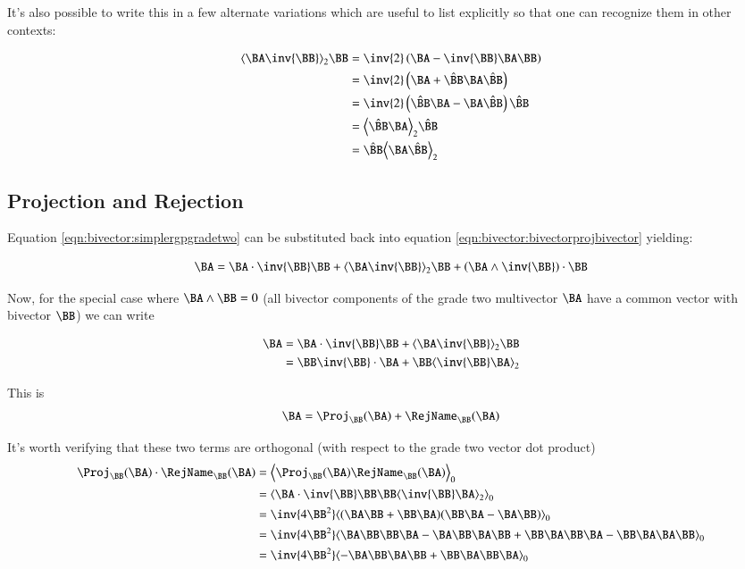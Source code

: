 It's also possible to write this in a few alternate variations which are useful to list explicitly so that one can recognize them in other contexts:

\begin{align*}
\gpgradetwo{\BA\inv{\BB}} \BB
&= \inv{2}\left(\BA - \inv{\BB}\BA\BB\right)  \\
&= \inv{2}\left(\BA + \hat{\BB}\BA\hat{\BB}\right)  \\
&= \inv{2}\left( \hat{\BB}\BA -\BA\hat{\BB} \right)\hat{\BB} \\
&= \gpgradetwo{\hat{\BB}\BA}\hat{\BB} \\
&= \hat{\BB}\gpgradetwo{{\BA}\hat{\BB}} \\
\end{align*}

\subsection{Projection and Rejection }

Equation \ref{eqn:bivector:simplergpgradetwo} can be substituted back into equation \ref{eqn:bivector:bivectorprojbivector} yielding:

\begin{equation}
\label{eqn:bivector:simplerbivectorprojbivector}
\BA =
\BA \cdot \inv{\BB} \BB \\
+\gpgradetwo{\BA\inv{\BB}} \BB
+\left(\BA \wedge \inv{\BB}\right) \cdot \BB 
\end{equation}

Now, for the special case where $\BA \wedge \BB = 0$ (all bivector components of the grade two multivector $\BA$ have a common vector with bivector $\BB$) we can write

\begin{align*}
\BA 
&= \BA \cdot \inv{\BB} \BB +\gpgradetwo{\BA\inv{\BB}} \BB \\
&= \BB \inv{\BB} \cdot {\BA} + \BB \gpgradetwo{\inv{\BB}\BA} \\
\end{align*}

This is
\begin{align}
\label{eqn:bivector:projrejbivectorbivector}
\BA = \Proj_{\BB}(\BA) + \RejName_{\BB}(\BA) 
\end{align}

It's worth verifying that these two terms are orthogonal (with respect to the grade two vector dot product)
\begin{align*}
\Proj_{\BB}(\BA) \cdot \RejName_{\BB}(\BA)
&= \gpgradezero{ \Proj_{\BB}(\BA) \RejName_{\BB}(\BA) } \\
&= \gpgradezero{ \BA \cdot \inv{\BB} \BB \BB \gpgradetwo{\inv{\BB}\BA} } \\
&= \inv{4\BB^2}\gpgradezero{ (\BA\BB + \BB\BA)(\BB\BA - \BA\BB) } \\
&= \inv{4\BB^2}\gpgradezero{ \BA\BB\BB\BA -\BA\BB\BA\BB +\BB\BA\BB\BA -\BB\BA\BA\BB } \\
&= \inv{4\BB^2}\gpgradezero{ -\BA\BB\BA\BB +\BB\BA\BB\BA } \\
\end{align*}

